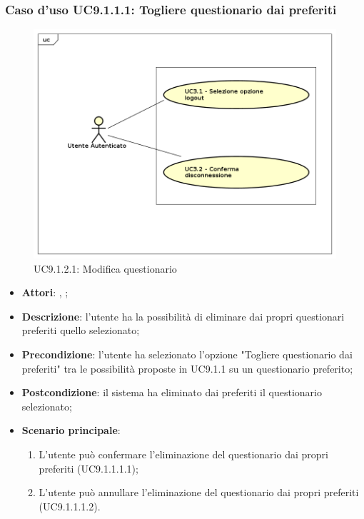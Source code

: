 			\subsubsection{Caso d'uso UC9.1.1.1: Togliere questionario dai preferiti}
			\label{UC9.1.1.1}
			\begin{figure}[h]
				\centering
				\includegraphics[scale=0.7,keepaspectratio]{UML/UC9.png}
				\caption{UC9.1.2.1: Modifica questionario}
			\end{figure}
			\FloatBarrier
			\begin{itemize}
				\item \textbf{Attori}: \uau, \uaupro;
				\item \textbf{Descrizione}: l'utente ha la possibilità di eliminare dai propri questionari preferiti quello selezionato;
				\item \textbf{Precondizione}: l'utente ha selezionato l'opzione "Togliere questionario dai preferiti" tra le possibilità proposte in UC9.1.1 su un questionario preferito;
				\item \textbf{Postcondizione}: il sistema ha eliminato dai preferiti il questionario selezionato;
				\item \textbf{Scenario principale}: 
					\begin{enumerate}
						\item L'utente può confermare l'eliminazione del questionario dai propri preferiti (UC9.1.1.1.1);
						\item L'utente può annullare l'eliminazione del questionario dai propri preferiti (UC9.1.1.1.2).
					\end{enumerate}
			\end{itemize}
				
